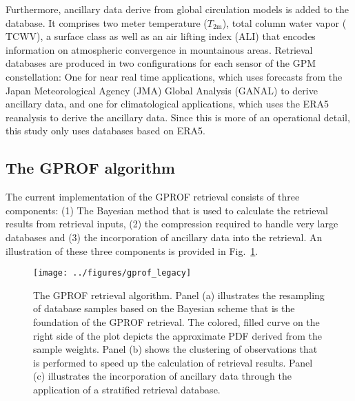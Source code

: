 \documentclass[a4paper,11pt,bibtotoc]{scrartcl}
\begin{document}
Furthermore, ancillary data derive from global circulation models is added to
the database. It comprises two meter temperature ($T_{\text{2m}}$), total column
water vapor ($\text{TCWV}$), a surface class as well as an air lifting index
(ALI) that encodes information on atmospheric convergence in mountainous areas.
Retrieval databases are produced in two configurations for each sensor of the
GPM constellation: One for near real time applications, which uses forecasts
from the Japan Meteorological Agency (JMA) Global Analysis (GANAL) to derive
ancillary data, and one for climatological applications, which uses the ERA5
reanalysis \citep{hersbach20} to derive the ancillary data. Since this is more
of an operational detail, this study only uses databases based on ERA5.


\subsection{The GPROF algorithm}
\label{sec:gprof}

The current implementation of the GPROF retrieval consists of three components:
(1) The Bayesian method that is used to calculate the retrieval results from
retrieval inputs, (2) the compression required to handle very large databases
and (3) the incorporation of ancillary data into the retrieval. An illustration
of these three components is provided in Fig.~\ref{fig:gprof_legacy}.

\begin{figure}[hbpt!]
  \centering \texttt{[image: ../figures/gprof\_legacy]}
  \caption{The GPROF retrieval algorithm. Panel (a) illustrates the resampling
    of database samples based on the Bayesian scheme that is the foundation of
    the GPROF retrieval. The colored, filled curve on the right side of the plot
    depicts the approximate PDF derived from the sample weights. Panel (b) shows
    the clustering of observations that is performed to speed up the calculation
    of retrieval results. Panel (c) illustrates the incorporation of ancillary
    data through the application of a stratified retrieval database.}
  \label{fig:gprof_legacy}
\end{figure}
\end{document}
